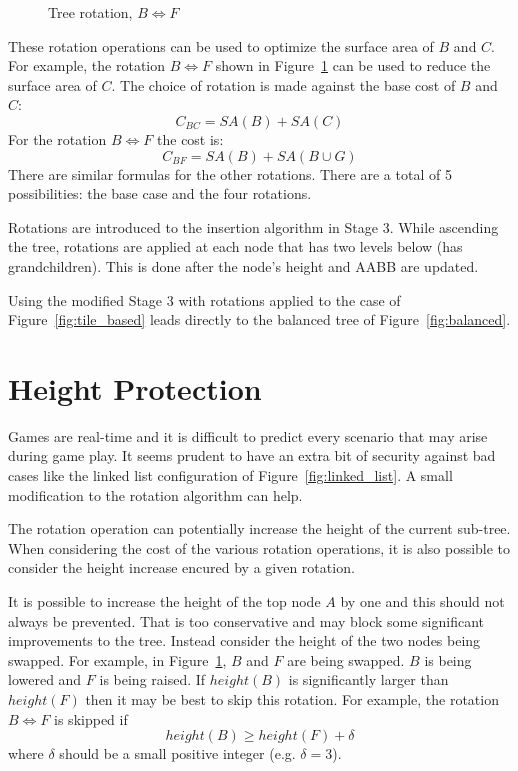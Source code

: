 \documentclass{article}
\begin{document}
\begin{figure}
	\begin{center}
		
	\end{center}
	\caption{Tree rotation, $B \Leftrightarrow F$ }
	\label{fig:rotate}
\end{figure}

These rotation operations can be used to optimize the surface area of $B$ and $C$. For example, the rotation $B \Leftrightarrow F$ shown in Figure~\ref{fig:rotate} can be used to reduce the surface area of $C$. The choice of rotation is made against the base cost of $B$ and $C$:
\[ C_{BC} = SA(B) + SA(C) \]
For the rotation $B \Leftrightarrow F$ the cost is:
\[ C_{BF} = SA(B) + SA(B \cup G) \]
There are similar formulas for the other rotations. There are a total of 5 possibilities: the base case and the four rotations.

Rotations are introduced to the insertion algorithm in Stage 3. While ascending the tree, rotations are applied at each node that has two levels below (has grandchildren). This is done after the node's height and AABB are updated.

Using the modified Stage 3 with rotations applied to the case of Figure~\ref{fig:tile_based} leads directly to the balanced tree of Figure~\ref{fig:balanced}.

\section{Height Protection}

Games are real-time and it is difficult to predict every scenario that may arise during game play. It seems prudent to have an extra bit of security against bad cases like the linked list configuration of Figure~\ref{fig:linked_list}. A small modification to the rotation algorithm can help.

The rotation operation can potentially increase the height of the current sub-tree. When considering the cost of the various rotation operations, it is also possible to consider the height increase encured by a given rotation.

It is possible to increase the height of the top node $A$ by one and this should not always be prevented. That is too conservative and may block some significant improvements to the tree. Instead consider the height of the two nodes being swapped. For example, in Figure~\ref{fig:rotate}, $B$ and $F$ are being swapped. $B$ is being lowered and $F$ is being raised. If $height(B)$ is significantly larger than $height(F)$ then it may be best to skip this rotation. For example, the rotation $B \Leftrightarrow F$ is skipped if
\[ height(B) \geq height(F) + \delta \]
where $\delta$ should be a small positive integer (e.g. $\delta = 3$).
\end{document}
